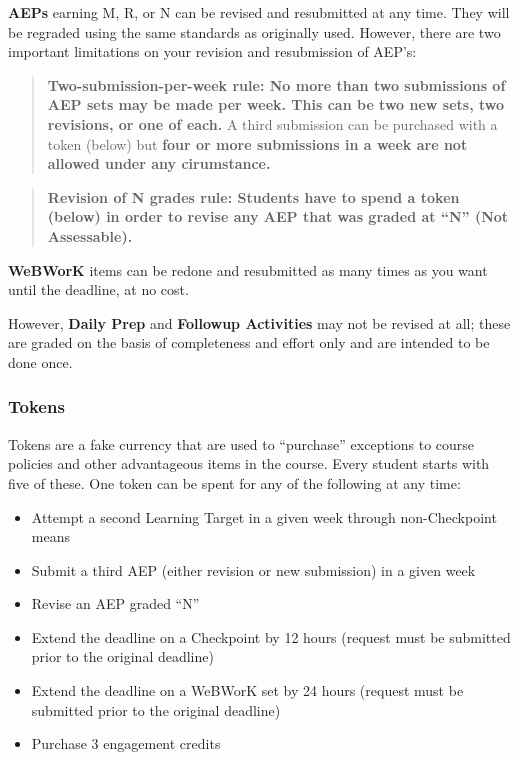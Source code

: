 \documentclass[]{article}
\providecommand{\tightlist}{%
  \setlength{\itemsep}{0pt}\setlength{\parskip}{0pt}}
\begin{document}
\textbf{AEPs} earning M, R, or N can be revised and resubmitted at any
time. They will be regraded using the same standards as originally used.
However, there are two important limitations on your revision and
resubmission of AEP's:

\begin{quote}
\textbf{Two-submission-per-week rule: No more than two submissions of
AEP sets may be made per week. This can be two new sets, two revisions,
or one of each.} A third submission can be purchased with a token
(below) but \textbf{four or more submissions in a week are not allowed
under any cirumstance.}
\end{quote}

\begin{quote}
\textbf{Revision of N grades rule: Students have to spend a token
(below) in order to revise any AEP that was graded at ``N'' (Not
Assessable).}
\end{quote}

\textbf{WeBWorK} items can be redone and resubmitted as many times as
you want until the deadline, at no cost.

However, \textbf{Daily Prep} and \textbf{Followup Activities} may not be
revised at all; these are graded on the basis of completeness and effort
only and are intended to be done once.

\hypertarget{tokens}{%
\subsubsection{Tokens}\label{tokens}}

Tokens are a fake currency that are used to ``purchase'' exceptions to
course policies and other advantageous items in the course. Every
student starts with five of these. One token can be spent for any of the
following at any time:

\begin{itemize}
\tightlist
\item
  Attempt a second Learning Target in a given week through
  non-Checkpoint means\\
\item
  Submit a third AEP (either revision or new submission) in a given week
\item
  Revise an AEP graded ``N''
\item
  Extend the deadline on a Checkpoint by 12 hours (request must be
  submitted prior to the original deadline)
\item
  Extend the deadline on a WeBWorK set by 24 hours (request must be
  submitted prior to the original deadline)
\item
  Purchase 3 engagement credits
\end{itemize}
\end{document}
